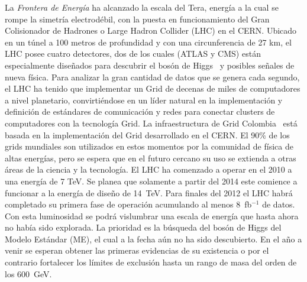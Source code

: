 La \emph{Frontera de Energía} ha alcanzado la escala del Tera, 
energía a la cual se rompe la simetría electrodébil, con la puesta en
funcionamiento del Gran Colisionador de Hadrones o
Large Hadron Collider (LHC) en el CERN. Ubicado en un túnel a
100 metros de profundidad y con una circunferencia de 27 km, el LHC
posee cuatro detectores, dos de los cuales (ATLAS y CMS) están
especialmente diseñados para descubrir el bosón de Higgs~\cite{Higgs:1964pj,Higgs:1966ev,Englert:1964et,Guralnik:1964eu} y posibles señales de nueva
física. Para analizar la gran cantidad de datos que se genera cada
segundo, el LHC ha tenido que implementar un Grid de decenas de miles
de computadores a nivel planetario, convirtiéndose en un líder natural
en la implementación y definición de estándares de comunicación y
redes para conectar clusters de computadores con la tecnología
Grid. La infraestructura de Grid Colombia~\cite{gridcolombia} está basada en la
implementación del Grid desarrollado en el CERN. El 90\% de los grids
mundiales son utilizados en estos momentos por la comunidad de física de
altas energías, pero se espera que en el futuro cercano su uso se
extienda a otras áreas de la ciencia y la tecnología. El LHC ha
comenzado a operar en el 2010 a una energía de 7 TeV.
Se planea que solamente a partir del 2014
este comience a funcionar a la energía de diseño de
14~TeV. Para finales del 2012 el LHC habrá completado su primera fase
de operación
acumulando al menos 8~fb$^{-1}$ de datos. Con esta luminosidad se podrá
vislumbrar una escala de energía que hasta ahora no había sido
explorada. La prioridad es la búsqueda del bosón de Higgs del Modelo Estándar (ME),
el cual a la fecha aún no ha sido descubierto. En el año a venir
se esperan obtener las primeras evidencias de su existencia o
por el contrario fortalecer los límites de exclusión hasta un rango de masa
del orden de los 600~GeV.

